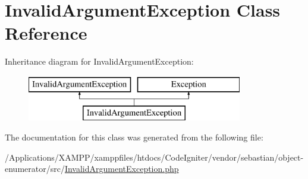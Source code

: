 \hypertarget{class_sebastian_bergmann_1_1_object_enumerator_1_1_invalid_argument_exception}{}\section{Invalid\+Argument\+Exception Class Reference}
\label{class_sebastian_bergmann_1_1_object_enumerator_1_1_invalid_argument_exception}
Inheritance diagram for Invalid\+Argument\+Exception\+:\begin{figure}[H]
\begin{center}
\leavevmode
\includegraphics[height=2.000000cm]{class_sebastian_bergmann_1_1_object_enumerator_1_1_invalid_argument_exception}
\end{center}
\end{figure}


The documentation for this class was generated from the following file\+:\begin{DoxyCompactItemize}
\item 
/\+Applications/\+X\+A\+M\+P\+P/xamppfiles/htdocs/\+Code\+Igniter/vendor/sebastian/object-\/enumerator/src/\mbox{\hyperlink{sebastian_2object-enumerator_2src_2_invalid_argument_exception_8php}{Invalid\+Argument\+Exception.\+php}}\end{DoxyCompactItemize}
